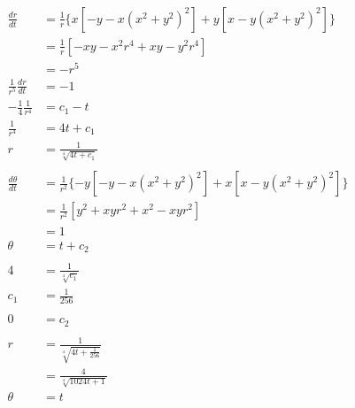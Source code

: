 \documentclass{article}
\begin{document}
\setcounter{subsubsection}{22}
\subsubsection{}

\begin{align*}
  \frac{d r}{d t}               & = \frac{1}{r} \{ x [-y - x (x^2 + y^2)^2] + y [x - y (x^2 + y^2)^2] \}    \\
                                & = \frac{1}{r} [-x y - x^2 r^4 + x y - y^2 r^4]                            \\
                                & = -r^5                                                                    \\
  \frac{1}{r^5} \frac{d r}{d t} & = -1                                                                      \\
  -\frac{1}{4} \frac{1}{r^4}    & = c_1 - t                                                                 \\
  \frac{1}{r^4}                 & = 4 t + c_1                                                               \\
  r                             & = \frac{1}{\sqrt[4]{4 t + c_1}}                                           \\ \\
  \frac{d \theta}{d t}          & = \frac{1}{r^2} \{ -y [-y - x (x^2 + y^2)^2] + x [x - y (x^2 + y^2)^2] \} \\
                                & = \frac{1}{r^2} [y^2 + x y r^2 + x^2 - x y r^2]                           \\
                                & = 1                                                                       \\
  \theta                        & = t + c_2                                                                 \\ \\
  4                             & = \frac{1}{\sqrt[4]{c_1}}                                                 \\
  c_1                           & = \frac{1}{256}                                                           \\ \\
  0                             & = c_2                                                                     \\ \\
  r                             & = \frac{1}{\sqrt[4]{4 t + \frac{1}{256}}}                                 \\
                                & = \frac{4}{\sqrt[4]{1024 t + 1}}                                          \\
  \theta                        & = t
\end{align*}
\end{document}
